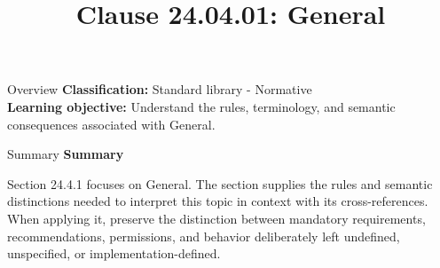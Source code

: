 \documentclass[10pt,letterpaper]{article}
\title{Clause 24.04.01: General}
\author{}
\date{}
\begin{document}
\maketitle
\begin{CornellOverviewBox}{Overview}
\textbf{Classification:} Standard library - Normative\\[2pt]
\textbf{Learning objective:} Understand the rules, terminology, and semantic consequences associated with General.
\end{CornellOverviewBox}\begin{CornellSummaryBox}{Summary}
{\sffamily\bfseries\color{Accent} Summary}\par\vspace{3pt}Section 24.4.1 focuses on General. The section supplies the rules and semantic distinctions needed to interpret this topic in context with its cross-references. When applying it, preserve the distinction between mandatory requirements, recommendations, permissions, and behavior deliberately left undefined, unspecified, or implementation-defined.
\end{CornellSummaryBox}
\end{document}
